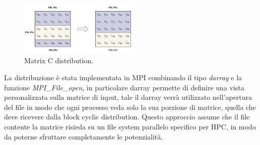 \documentclass[conference]{IEEEtran}
\begin{document}
\begin{figure}[H]
    \centering
    \includegraphics[width=0.5\textwidth]{resources/matrixC_row_block_cyclic_distribution.jpg}
    \caption{Matrix C distribution.}
    \label{fig:matrix_c_distribution}
\end{figure}
La distribuzione è stata implementata in MPI combinando il tipo \textit{darray} e la funzione \textit{MPI\_File\_open}, in particolare darray permette di definire una vista personalizzata sulla matrice di input, tale il darray verrà utilizzato nell'apertura del file in modo che ogni processo veda solo la sua porzione di matrice, quella che deve ricevere dalla block cyclic distribution. Questo approccio assume che il file contente la matrice risieda su un file system parallelo specifico per HPC, in modo da poterne sfruttare completamente le potenzialità.
\end{document}
